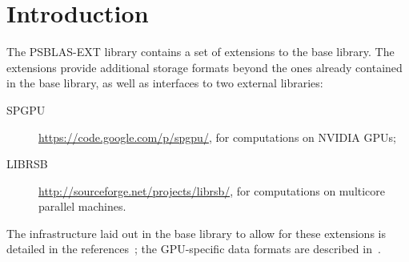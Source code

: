 \section{Introduction}\label{sec:intro}

The PSBLAS-EXT  library contains a set of extensions to the base
library. The extensions provide additional storage formats beyond the
 ones already contained in the base library, as well as interfaces to
 two external libraries:
\begin{description}
\item[SPGPU] \url{https://code.google.com/p/spgpu/}, for computations on
  NVIDIA GPUs;
\item[LIBRSB] \url{http://sourceforge.net/projects/librsb/}, for
  computations on multicore parallel machines. 
\end{description}
The infrastructure laid out in the base library to allow for these
extensions is detailed in the references~\cite{CaFiRo:2014,Sparse03};
the GPU-specific data formats are described in~\cite{OurTechRep}. 


